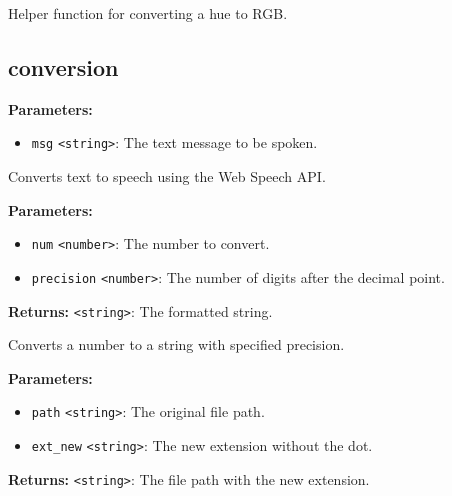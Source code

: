 \documentclass[12pt,a4paper]{article}
\begin{document}
\noindent Helper function for converting a hue to RGB.


\subsection{conversion}
\vspace{5mm}
\noindent {}


\noindent \textbf{Parameters:}
\begin{itemize}
  \item \texttt{msg} \texttt{<string>}: The text message to be spoken.
\end{itemize}

\noindent Converts text to speech using the Web Speech API.

\vspace{5mm}
\noindent {}


\noindent \textbf{Parameters:}
\begin{itemize}
  \item \texttt{num} \texttt{<number>}: The number to convert.
  \item \texttt{precision} \texttt{<number>}: The number of digits after the decimal point.
\end{itemize}

\noindent \textbf{Returns:} \texttt{<string>}: The formatted string.

\noindent Converts a number to a string with specified precision.

\vspace{5mm}
\noindent {}


\noindent \textbf{Parameters:}
\begin{itemize}
  \item \texttt{path} \texttt{<string>}: The original file path.
  \item \texttt{ext\_new} \texttt{<string>}: The new extension without the dot.
\end{itemize}

\noindent \textbf{Returns:} \texttt{<string>}: The file path with the new extension.
\end{document}
